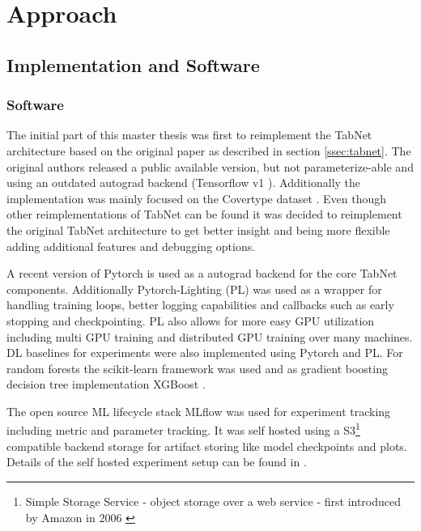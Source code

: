 \documentclass[../main.tex]{subfiles}
\begin{document}
\section{Approach} \label{sec:approach}

\subsection{Implementation and Software}

\subsubsection{Software}

The initial part of this master thesis was first to reimplement the TabNet architecture based on the original paper as described in section \ref{ssec:tabnet}. The original authors released a public available version, but not parameterize-able and using an outdated autograd backend (Tensorflow v1 \cite{tensorflow2015-whitepaper}). Additionally the implementation was mainly focused on the Covertype dataset \cite{noauthor_google-researchtabnet_nodate}. Even though other reimplementations of TabNet can be found it was decided to reimplement the original TabNet architecture to get better insight and being more flexible adding additional features and debugging options. 
\newline

A recent version of Pytorch \cite{NEURIPS2019_9015} is used as a autograd backend for the core TabNet components. Additionally Pytorch-Lighting (PL) \cite{falcon2019pytorch} was used as a wrapper for handling training loops, better logging capabilities and callbacks such as early stopping and checkpointing. PL also allows for more easy GPU utilization including multi GPU training and distributed GPU training over many machines. DL baselines for experiments were also implemented using Pytorch and PL. For random forests the scikit-learn \cite{scikit-learn} framework was used and as gradient boosting decision tree implementation XGBoost \cite{chen_xgboost_2016}.
\newline

The open source ML lifecycle stack MLflow \cite{noauthor_mlflow_nodate} was used for experiment tracking including metric and parameter tracking. It was self hosted using a S3\footnote{Simple Storage Service - object storage over a web service - first introduced by Amazon in 2006 \cite{noauthor_amazon_2021}} compatible backend storage for artifact storing like model checkpoints and plots. Details of the self hosted experiment setup can be found in \cite{clemens_kriechbaumer_clemens33mlflow_2021}. 
\end{document}
